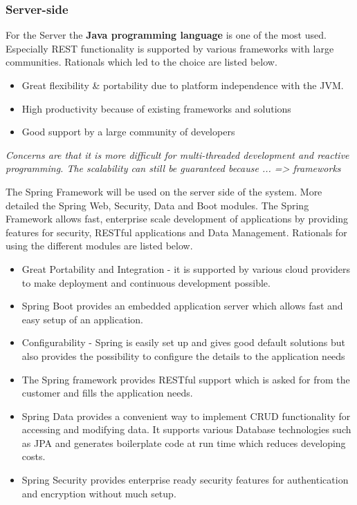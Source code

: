 \documentclass[a4paper,11pt]{article}
\begin{document}
\subsubsection{Server-side}
For the Server the \textbf{Java programming language} is one of the most used. Especially REST functionality is supported by various frameworks with large communities. Rationals which led to the choice are listed below.
\begin{itemize}
\item Great flexibility \& portability due to platform independence with the JVM.
\item High productivity because of existing frameworks and solutions
\item Good support by a large community of developers
\end{itemize}
\textit{Concerns are that it is more difficult for multi-threaded development and reactive programming. The scalability can still be guaranteed because ... => frameworks}

The Spring Framework will be used on the server side of the system. More detailed the Spring Web, Security, Data and Boot modules.
The Spring Framework allows fast, enterprise scale development of applications by providing features for security, RESTful applications and Data Management. Rationals for using the different modules are listed below.
\begin{itemize}
\item Great Portability and Integration - it is supported by various cloud providers to make deployment and continuous development possible.
\item Spring Boot provides an embedded application server which allows fast and easy setup of an application.
\item Configurability - Spring is easily set up and gives good default solutions but also provides the possibility to configure the details to the application needs
\item The Spring framework provides RESTful support which is asked for from the customer and fills the application needs.
\item Spring Data provides a convenient way to implement CRUD functionality for accessing and modifying data. It supports various Database technologies such as JPA and generates boilerplate code at run time which reduces developing costs.
\item Spring Security provides enterprise ready security features for authentication and encryption without much setup.
\end{itemize}
\end{document}
